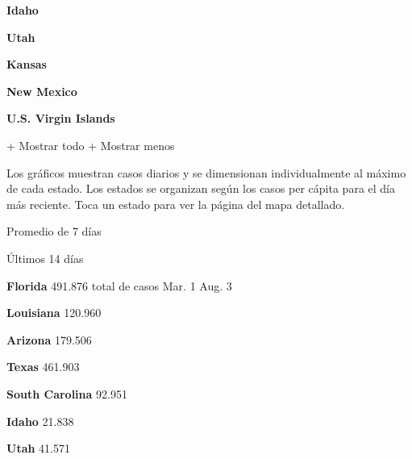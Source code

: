 \textbf{Idaho}

\href{https://www.nytimes.com/interactive/2020/us/utah-coronavirus-cases.html}{}

\textbf{Utah}

\href{https://www.nytimes.com/interactive/2020/us/kansas-coronavirus-cases.html}{}

\textbf{Kansas}

\href{https://www.nytimes.com/interactive/2020/us/new-mexico-coronavirus-cases.html}{}

\textbf{New Mexico}

\textbf{U.S. Virgin Islands}

+ Mostrar todo + Mostrar menos

Los gráficos muestran casos diarios y se dimensionan individualmente al
máximo de cada estado. Los estados se organizan según los casos per
cápita para el día más reciente. Toca un estado para ver la página del
mapa detallado.

\href{https://www.nytimes.com/interactive/2020/us/florida-coronavirus-cases.html}{}

Promedio de 7 días

Últimos 14 días

\textbf{Florida} 491.876 total de casos Mar. 1 Aug. 3

\href{https://www.nytimes.com/interactive/2020/us/louisiana-coronavirus-cases.html}{}

\textbf{Louisiana} 120.960

\href{https://www.nytimes.com/interactive/2020/us/arizona-coronavirus-cases.html}{}

\textbf{Arizona} 179.506

\href{https://www.nytimes.com/interactive/2020/us/texas-coronavirus-cases.html}{}

\textbf{Texas} 461.903

\href{https://www.nytimes.com/interactive/2020/us/south-carolina-coronavirus-cases.html}{}

\textbf{South Carolina} 92.951

\href{https://www.nytimes.com/interactive/2020/us/idaho-coronavirus-cases.html}{}

\textbf{Idaho} 21.838

\href{https://www.nytimes.com/interactive/2020/us/utah-coronavirus-cases.html}{}

\textbf{Utah} 41.571

\href{https://www.nytimes.com/interactive/2020/us/kansas-coronavirus-cases.html}{}

